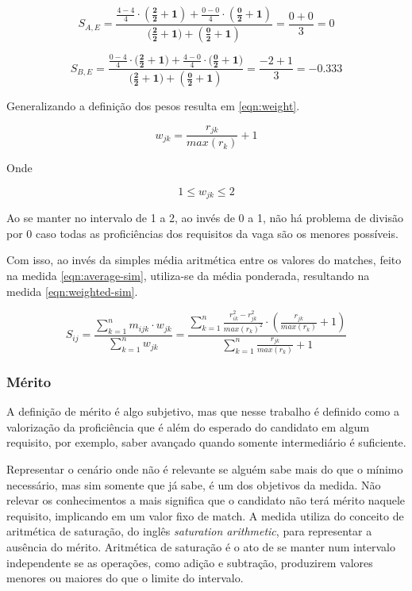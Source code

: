 \documentclass[preprint,12pt]{elsarticle}
\begin{document}
$$ S_{A,E} = \frac{\tfrac{4 - 4}{4} \cdot \boldsymbol{(\tfrac{2}{2} + 1)} + \tfrac{0 - 0}{4} \cdot \boldsymbol{(\tfrac{0}{2} + 1)}}{(\boldsymbol{\tfrac{2}{2} + 1)} + \boldsymbol{(\tfrac{0}{2} + 1)}} = \frac{0 + 0}{3} = 0 $$

$$ S_{B,E} = \frac{\tfrac{0 - 4}{4} \cdot (\boldsymbol{\tfrac{2}{2} + 1)} + \tfrac{4 - 0}{4} \cdot (\boldsymbol{\tfrac{0}{2} + 1)}}{(\boldsymbol{\tfrac{2}{2} + 1)} + \boldsymbol{(\tfrac{0}{2} + 1)}} = \frac{-2 + 1}{3} = -0.333 $$


Generalizando a definição dos pesos resulta em \ref{eqn:weight}. 

\begin{equation}
\label{eqn:weight}
    w_{jk} = \frac{r_{jk}}{max(r_k)} + 1
\end{equation}

Onde

\begin{equation}
1 \leq w_{jk} \leq 2
\end{equation}

Ao se manter no intervalo de 1 a 2, ao invés de 0 a 1, não há problema de divisão por 0 caso todas as proficiências dos requisitos da vaga são os menores possíveis.

Com isso, ao invés da simples média aritmética entre os valores do matches, feito na medida \ref{eqn:average-sim}, utiliza-se da média ponderada, resultando na medida \ref{eqn:weighted-sim}.  

\begin{equation}
\label{eqn:weighted-sim}
S_{ij} = \frac{\sum_{k=1}^n m_{ijk} \cdot w_{jk}}
              {\sum_{k=1}^n w_{jk}} = 
         \frac{\sum_{k=1}^n \frac{r_{ik}^2 - r_{jk}^2}{max(r_k)^2} \cdot (\frac{r_{jk}}{max(r_k)} + 1)}
              {\sum_{k=1}^n {\frac{r_{jk}}{max(r_k)} + 1}}
\end{equation}

\subsubsection{Mérito}
\label{sssec:merit}

A definição de mérito é algo subjetivo, mas que nesse trabalho é definido como a valorização da proficiência que é além do esperado do candidato em algum requisito, por exemplo, saber avançado quando somente intermediário é suficiente. 

Representar o cenário onde não é relevante se alguém sabe mais do que o mínimo necessário, mas sim somente que já sabe, é um dos objetivos da medida. Não relevar os conhecimentos a mais significa que o candidato não terá mérito naquele requisito, implicando em um valor fixo de match. A medida utiliza do conceito de  aritmética de saturação, do inglês \textit{saturation arithmetic}, para representar a ausência do mérito. Aritmética de saturação é o ato de se manter num intervalo independente se as operações, como adição e subtração, produzirem valores menores ou maiores do que o limite do intervalo.
\end{document}
